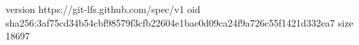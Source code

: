 version https://git-lfs.github.com/spec/v1
oid sha256:3af75cd34b54cbf98579f3cfb22604e1bae0d09ca24f9a726c55f1421d332ea7
size 18697
